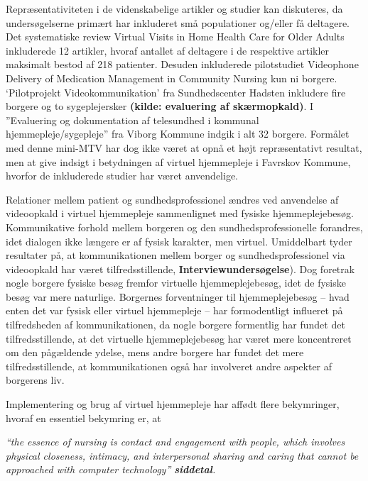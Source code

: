 Repræsentativiteten i de videnskabelige artikler og studier kan diskuteres, da undersøgelserne primært har inkluderet små populationer og/eller få deltagere. Det systematiske review Virtual Visits in Home Health Care for Older Adults inkluderede 12 artikler, hvoraf antallet af deltagere i de respektive artikler maksimalt bestod af 218 patienter\cite{Baf2}. Desuden inkluderede pilotstudiet Videophone Delivery of Medication Management in Community Nursing kun ni borgere\cite{wade}. ‘Pilotprojekt Videokommunikation’ fra Sundhedscenter Hadsten inkludere fire borgere og to sygeplejersker \textbf{(kilde: evaluering af skærmopkald)}. I ”Evaluering og dokumentation af telesundhed i kommunal hjemmepleje/sygepleje” fra Viborg Kommune indgik i alt 32 borgere\cite{kandidat}. Formålet med denne mini-MTV har dog ikke været at opnå et højt repræsentativt resultat, men at give indsigt i betydningen af virtuel hjemmepleje i Favrskov Kommune, hvorfor de inkluderede studier har været anvendelige. 

Relationer mellem patient og sundhedsprofessionel ændres ved anvendelse af videoopkald i virtuel hjemmepleje sammenlignet med fysiske hjemmeplejebesøg. Kommunikative forhold mellem borgeren og den sundhedsprofessionelle forandres, idet dialogen ikke længere er af fysisk karakter, men virtuel. Umiddelbart tyder resultater på, at kommunikationen mellem borger og sundhedsprofessionel via videoopkald har været tilfredsstillende\cite{Baf2}, \textbf{Interviewundersøgelse}). Dog foretrak nogle borgere fysiske besøg fremfor virtuelle hjemmeplejebesøg, idet de fysiske besøg var mere naturlige\cite{kandidat}. Borgernes forventninger til hjemmeplejebesøg – hvad enten det var fysisk eller virtuel hjemmepleje – har formodentligt influeret på tilfredsheden af kommunikationen, da nogle borgere formentlig har fundet det tilfredsstillende, at det virtuelle hjemmeplejebesøg har været mere koncentreret om den pågældende ydelse, mens andre borgere har fundet det mere tilfredsstillende, at kommunikationen også har involveret andre aspekter af borgerens liv.

Implementering og brug af virtuel hjemmepleje har affødt flere bekymringer, hvoraf en essentiel bekymring er, at 

\begin{center}
\textit{“the essence of nursing is contact and engagement with people, which involves physical closeness, intimacy, and interpersonal sharing and caring that cannot be approached with computer technology”\cite{telenursing} \textbf{siddetal}.}
\end{center}

